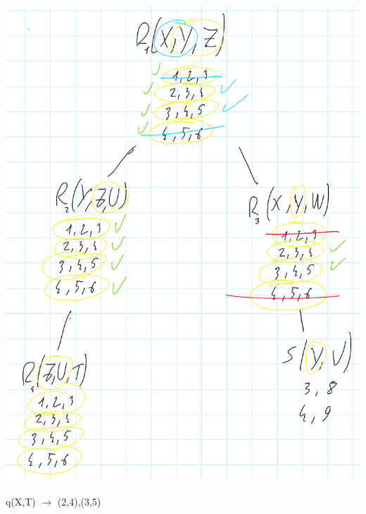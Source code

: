 \documentclass{article}
\begin{document}
\begin{itemize}
\includegraphics[scale=0.2]{10_3.jpg}\\\\
q(X,T) $\rightarrow$ (2,4),(3,5)
\end{itemize}
\end{document}
